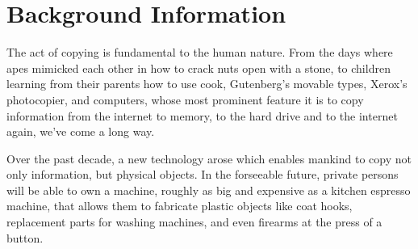 \section{Background Information}

The act of copying is fundamental to the human nature.  From the days where apes
mimicked each other in how to crack nuts open with a stone, to children learning
from their parents how to use cook, Gutenberg's movable types, Xerox's
photocopier, and computers, whose most prominent feature it is to copy
information from the internet to memory, to the hard drive and to the internet
again, we've come a long way.

Over the past decade, a new technology arose which enables mankind to copy not
only information, but physical objects.  In the forseeable future, private
persons will be able to own a machine, roughly as big and expensive as a
kitchen espresso machine, that allows them to fabricate plastic objects like
coat hooks, replacement parts for washing machines, and even firearms at the
press of a button.
